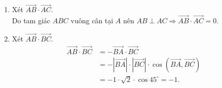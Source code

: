\begin{ex}
{\begin{enumerate}[$\bullet$]
\begin{align*}
				&=1\cdot \sqrt{2}\cdot \cos 45^\circ=1. 
			\end{align*}
			\item  Xét $\overrightarrow{AB}\cdot \overrightarrow{AC}$.\\
			Do tam giác $ABC$ vuông cân tại $A$ nên $AB\perp  AC\Rightarrow \overrightarrow{AB}\cdot \overrightarrow{AC}=0$.
			\item Xét  $\overrightarrow{AB}\cdot \overrightarrow{BC}$.
			\begin{align*}
				\overrightarrow{AB}\cdot  \overrightarrow{BC}&=-\overrightarrow{BA}\cdot \overrightarrow{BC}\\
				&=-\left|\overrightarrow{BA}\right|\cdot\left|\overrightarrow{BC} \right|\cdot\cos\left(\overrightarrow{BA},\overrightarrow{BC}  \right)\\
				&=-1\cdot  \sqrt{2}\cdot \cos 45^\circ=-1.
			\end{align*}
		\end{enumerate}
	} 
\end{ex}


